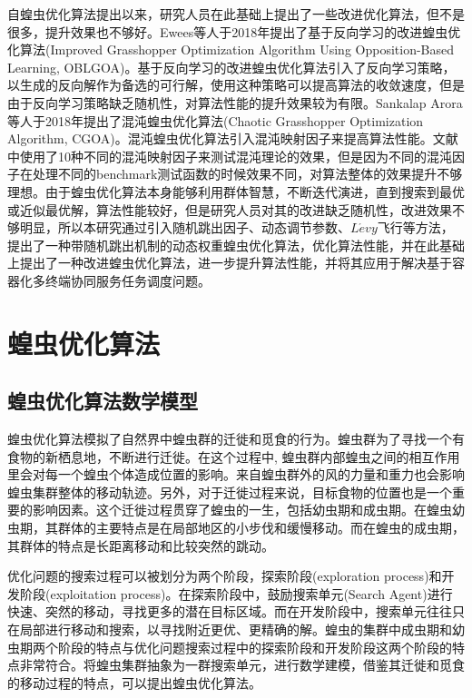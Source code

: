 自蝗虫优化算法提出以来，研究人员在此基础上提出了一些改进优化算法，但不是很多，提升效果也不够好。Ewees等人于2018年提出了基于反向学习的改进蝗虫优化算法(Improved Grasshopper Optimization Algorithm Using Opposition-Based Learning, OBLGOA)\cite{ewees2018improved}。基于反向学习的改进蝗虫优化算法引入了反向学习策略，以生成的反向解作为备选的可行解，使用这种策略可以提高算法的收敛速度，但是由于反向学习策略缺乏随机性，对算法性能的提升效果较为有限。Sankalap Arora等人于2018年提出了混沌蝗虫优化算法(Chaotic Grasshopper Optimization Algorithm, CGOA)\cite{arora2018chaotic}。混沌蝗虫优化算法引入混沌映射因子来提高算法性能。文献中使用了10种不同的混沌映射因子来测试混沌理论的效果，但是因为不同的混沌因子在处理不同的benchmark测试函数的时候效果不同，对算法整体的效果提升不够理想。由于蝗虫优化算法本身能够利用群体智慧，不断迭代演进，直到搜索到最优或近似最优解，算法性能较好，但是研究人员对其的改进缺乏随机性，改进效果不够明显，所以本研究通过引入随机跳出因子、动态调节参数、$L\acute{e}vy$飞行等方法，提出了一种带随机跳出机制的动态权重蝗虫优化算法，优化算法性能，并在此基础上提出了一种改进蝗虫优化算法，进一步提升算法性能，并将其应用于解决基于容器化多终端协同服务任务调度问题。

\section{蝗虫优化算法}\label{sec:task_scheduling_GOA}

\subsection{蝗虫优化算法数学模型}

蝗虫优化算法模拟了自然界中蝗虫群的迁徙和觅食的行为。蝗虫群为了寻找一个有食物的新栖息地，不断进行迁徙。在这个过程中, 蝗虫群内部蝗虫之间的相互作用里会对每一个蝗虫个体造成位置的影响。来自蝗虫群外的风的力量和重力也会影响蝗虫集群整体的移动轨迹。另外，对于迁徙过程来说，目标食物的位置也是一个重要的影响因素。这个迁徙过程贯穿了蝗虫的一生，包括幼虫期和成虫期。在蝗虫幼虫期，其群体的主要特点是在局部地区的小步伐和缓慢移动。而在蝗虫的成虫期，其群体的特点是长距离移动和比较突然的跳动。

优化问题的搜索过程可以被划分为两个阶段，探索阶段(exploration process)和开发阶段(exploitation process)。在探索阶段中，鼓励搜索单元(Search Agent)进行快速、突然的移动，寻找更多的潜在目标区域。而在开发阶段中，搜索单元往往只在局部进行移动和搜索，以寻找附近更优、更精确的解。蝗虫的集群中成虫期和幼虫期两个阶段的特点与优化问题搜索过程中的探索阶段和开发阶段这两个阶段的特点非常符合。将蝗虫集群抽象为一群搜索单元，进行数学建模，借鉴其迁徙和觅食的移动过程的特点，可以提出蝗虫优化算法。

